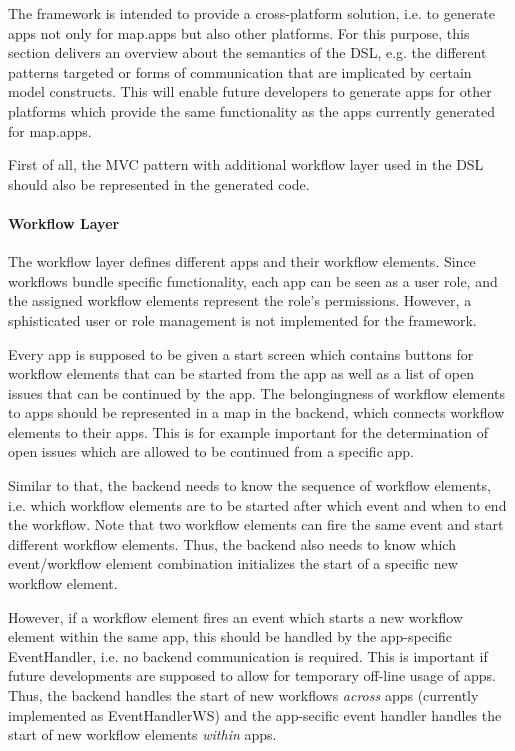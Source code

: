 
The \MD framework is intended to provide a cross-platform solution, i.e. to generate apps not only for map.apps but also other platforms. For this purpose, this section delivers an overview about the semantics of the DSL, e.g. the different patterns targeted or forms of communication that are implicated by certain model constructs. This will enable future developers to generate apps for other platforms which provide the same functionality as the apps currently generated for map.apps.

First of all, the MVC pattern with additional workflow layer used in the DSL should also be represented in the generated code.

\paragraph{Workflow Layer}
The workflow layer defines different apps and their workflow elements. Since workflows bundle specific functionality, each app can be seen as a user role, and the assigned workflow elements represent the role's permissions. However, a sphisticated user or role management is not implemented for the \MD framework.

Every app is supposed to be given a start screen which contains buttons for workflow elements that can be started from the app as well as a list of open issues that can be continued by the app. The belongingness of workflow elements to apps should be represented in a map in the backend, which connects workflow elements to their apps. This is for example important for the determination of open issues which are allowed to be continued from a specific app.

Similar to that, the backend needs to know the sequence of workflow elements, i.e. which workflow elements are to be started after which event and when to end the workflow. Note that two workflow elements can fire the same event and start different workflow elements. Thus, the backend also needs to know which event/workflow element combination initializes the start of a specific new workflow element.

However, if a workflow element fires an event which starts a new workflow element within the same app, this should be handled by the app-specific EventHandler, i.e. no backend communication is required. This is important if future developments are supposed to allow for temporary off-line usage of apps. Thus, the backend handles the start of new workflows \textit{across} apps (currently implemented as EventHandlerWS) and the app-secific event handler handles the start of new workflow elements \textit{within} apps.

